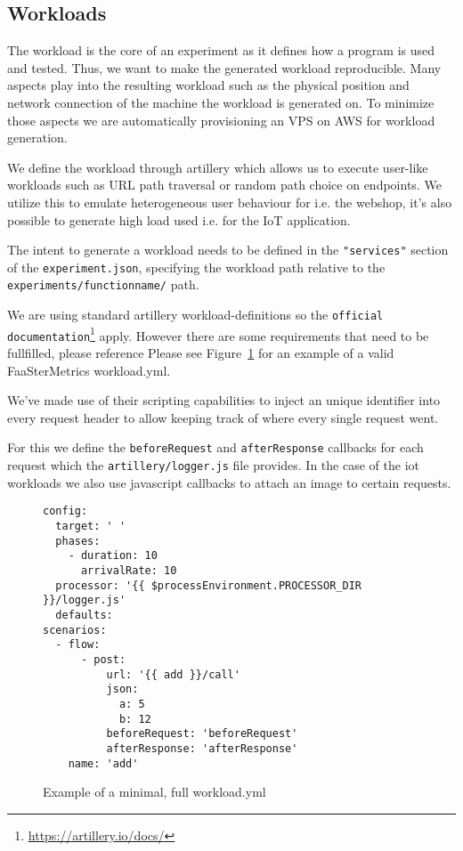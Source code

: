 \documentclass[../main.tex]{subfiles}
\begin{document}
\subsection{Workloads}\label{sec:WorkloadsStructure}

The workload is the core of an experiment as it defines how a program is used and tested. Thus, we want to make the generated workload reproducible. Many aspects play into the resulting workload such as the physical position and network connection of the machine the workload is generated on. To minimize those aspects we are automatically provisioning an VPS on AWS for workload generation.

We define the workload through artillery which allows us to execute user-like workloads such as URL path traversal or random path choice on endpoints. We utilize this to emulate heterogeneous user behaviour for i.e. the webshop, it's also possible to generate high load used i.e. for the IoT application.

The intent to generate a workload needs to be defined in the \texttt{"services"} section of the \texttt{experiment.json}, specifying the workload path relative to the \texttt{experiments/functionname/} path. %

We are using standard artillery workload-definitions so the \texttt{official documentation}\footnote{\url{https://artillery.io/docs/}} apply. However there are some requirements that need to be fullfilled, please reference %
Please see Figure~\ref{fig:exampleWorkloadYML} for an example of a valid FaaSterMetrics workload.yml.

We've made use of their scripting capabilities to inject an unique identifier into every request header to allow keeping track of where every single request went. 

For this we define the \texttt{beforeRequest} and \texttt{afterResponse} callbacks for each request which the \texttt{artillery/logger.js} file provides.
In the case of the iot workloads we also use javascript callbacks to attach an image to certain requests.

\begin{figure}[H]
  \begin{tcolorbox}[titleDetachedStyle, title=\texttt{workload.yml}]
  \begin{verbatim}
config:
  target: ' '
  phases:
    - duration: 10
      arrivalRate: 10
  processor: '{{ $processEnvironment.PROCESSOR_DIR }}/logger.js'
  defaults:
scenarios:
  - flow:
      - post:
          url: '{{ add }}/call'
          json:
            a: 5
            b: 12
          beforeRequest: 'beforeRequest'
          afterResponse: 'afterResponse'
    name: 'add'
\end{verbatim}
\end{tcolorbox}
\caption{Example of a minimal, full workload.yml}%
\label{fig:exampleWorkloadYML}
\end{figure}
\end{document}
